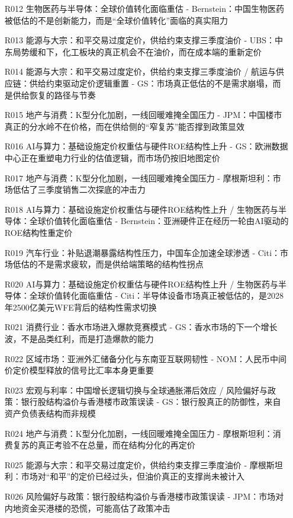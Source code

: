 \documentclass[11pt]{ctexart}
\begin{document}
\begin{itemize}
  \item [R012] 生物医药与半导体：全球价值转化面临重估 - Bernstein：中国生物医药被低估的不是创新能力，而是“全球价值转化”面临的真实阻力
  \item [R013] 能源与大宗：和平交易过度定价，供给约束支撑三季度油价 - UBS：中东局势缓和下，化工板块的真正机会不在油价，而在成本端的重新定价
  \item [R014] 能源与大宗：和平交易过度定价，供给约束支撑三季度油价 / 航运与供应链：供给约束驱动定价逻辑重置 - GS：市场真正低估的不是需求崩塌，而是供给恢复的路径与节奏
  \item [R015] 地产与消费：K型分化加剧，一线回暖难掩全国压力 - JPM：中国楼市真正的分水岭不在价格，而在供给侧的“窄复苏”能否撑到政策显效
  \item [R016] AI与算力：基础设施定价权重估与硬件ROE结构性上升 - GS：欧洲数据中心正在重塑电力行业的估值逻辑，而市场仍按旧地图定价
  \item [R017] 地产与消费：K型分化加剧，一线回暖难掩全国压力 - 摩根斯坦利：市场低估了三季度销售二次探底的冲击力
  \item [R018] AI与算力：基础设施定价权重估与硬件ROE结构性上升 / 生物医药与半导体：全球价值转化面临重估 - Bernstein：亚洲硬件正在经历一轮由AI驱动的ROE结构性重定价
  \item [R019] 汽车行业：补贴退潮暴露结构性压力，中国车企加速全球渗透 - Citi：市场低估的不是需求疲软，而是供给端策略的结构性拐点
  \item [R020] AI与算力：基础设施定价权重估与硬件ROE结构性上升 / 生物医药与半导体：全球价值转化面临重估 - Citi：半导体设备市场真正被低估的，是2028年2500亿美元WFE背后的结构性需求切换
  \item [R021] 消费行业：香水市场进入爆款竞赛模式 - GS：香水市场的下一个增长波，不是品类红利，而是打造爆款的能力
  \item [R022] 区域市场：亚洲外汇储备分化与东南亚互联网韧性 - NOM：人民币中间价定价模型释放的信号比汇率本身更重要
  \item [R023] 宏观与利率：中国增长逻辑切换与全球通胀滞后效应 / 风险偏好与政策：银行股结构溢价与香港楼市政策误读 - GS：银行股真正的防御性，来自资产负债表结构而非规模
  \item [R024] 地产与消费：K型分化加剧，一线回暖难掩全国压力 - 摩根斯坦利：消费复苏的真正考验不在总量，而在结构分化的再定价
  \item [R025] 能源与大宗：和平交易过度定价，供给约束支撑三季度油价 - 摩根斯坦利：市场对“和平”的定价已经过头，但油价真正的支撑尚未被计入
  \item [R026] 风险偏好与政策：银行股结构溢价与香港楼市政策误读 - JPM：市场对内地资金买港楼的恐慌，可能高估了政策冲击

\end{itemize}
\end{document}
